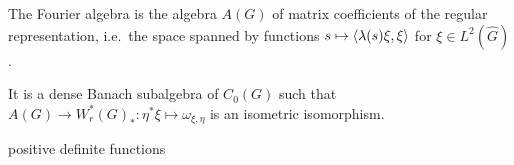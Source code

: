 \documentclass{../../large}
\begin{document}
\begin{prb}
The Fourier algebra is the algebra $A(G)$ of matrix coefficients of the regular representation, i.e.~the space spanned by functions $s\mapsto\langle\lambda(s)\xi,\xi\rangle$ for $\xi\in L^2(\hat G)$.

It is a dense Banach subalgebra of $C_0(G)$ such that $A(G)\to W_r^*(G)_*:\eta^*\xi\mapsto\omega_{\xi,\eta}$ is an isometric isomorphism.

positive definite functions


\end{prb}
\begin{pf}

\end{pf}
\end{document}

